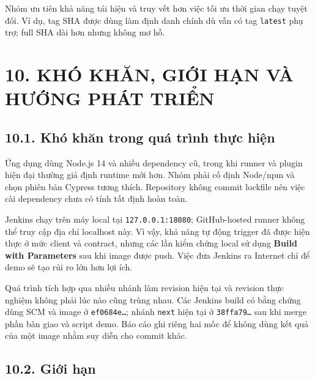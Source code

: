 \documentclass[
  vietnamese,
  12pt,
  a4paper,
  oneside]{report}
\begin{document}
Nhóm ưu tiên khả năng tái hiện và truy vết hơn việc tối ưu thời gian
chạy tuyệt đối. Ví dụ, tag SHA được dùng làm định danh chính dù vẫn có
tag \texttt{latest} phụ trợ; full SHA dài hơn nhưng không mơ hồ.

\chapter{10. KHÓ KHĂN, GIỚI HẠN VÀ HƯỚNG PHÁT
TRIỂN}\label{10-khuxf3-khux103n-giux1edbi-hux1ea1n-vuxe0-hux1b0ux1edbng-phuxe1t-triux1ec3n}

\section{10.1. Khó khăn trong quá trình thực
hiện}\label{101-khuxf3-khux103n-trong-quuxe1-truxecnh-thux1ef1c-hiux1ec7n}

Ứng dụng dùng Node.js 14 và nhiều dependency cũ, trong khi runner và
plugin hiện đại thường giả định runtime mới hơn. Nhóm phải cố định
Node/npm và chọn phiên bản Cypress tương thích. Repository không commit
lockfile nên việc cài dependency chưa có tính tất định hoàn toàn.

Jenkins chạy trên máy local tại \texttt{127.0.0.1:18080}; GitHub-hosted
runner không thể truy cập địa chỉ localhost này. Vì vậy, khả năng tự
động trigger đã được hiện thực ở mức client và contract, nhưng các lần
kiểm chứng local sử dụng \textbf{Build with Parameters} sau khi image
được push. Việc đưa Jenkins ra Internet chỉ để demo sẽ tạo rủi ro lớn
hơn lợi ích.

Quá trình tích hợp qua nhiều nhánh làm revision hiện tại và revision
thực nghiệm không phải lúc nào cũng trùng nhau. Các Jenkins build có
bằng chứng dùng SCM và image ở \texttt{ef0684e…}; nhánh \texttt{next}
hiện tại ở \texttt{38ffa79…} sau khi merge phần bàn giao và script demo.
Báo cáo ghi riêng hai mốc để không dùng kết quả của một image nhằm suy
diễn cho commit khác.

\section{10.2. Giới hạn}\label{102-giux1edbi-hux1ea1n}
\end{document}
